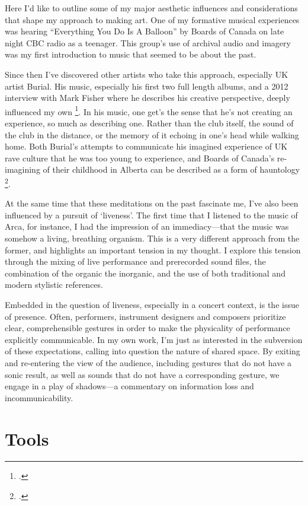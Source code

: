 \documentclass[12pt,twoside,maitrise]{dms_ks}
\theoremstyle{definition}
\begin{document}
{Here I'd like to outline some of my major aesthetic influences and considerations that shape my approach to making art. 
One of my formative musical experiences was hearing “Everything You Do Is A Balloon” by Boards of Canada on late night CBC radio as a teenager. 
This group's use of archival audio and imagery was my first introduction to music that seemed to be about the past. 

Since then I've discovered other artists who take this approach, especially UK artist Burial. 
His music, especially his first two full length albums, and a 2012 interview with Mark Fisher where he describes his creative perspective, deeply influenced my own \footcite{fisher_burial_2012}. 
In his music, one get's the sense that he's not creating an experience, so much as describing one. 
Rather than the club itself, the sound of the club in the distance, or the memory of it echoing in one's head while walking home. 
Both Burial's attempts to communicate his imagined experience of UK rave culture that he was too young to experience, and Boards of Canada's re-imagining of their childhood in Alberta can be described as a form of hauntology \footcite{alary_vers_2020}.

At the same time that these meditations on the past fascinate me, I've also been influenced by a pursuit of `liveness'. 
The first time that I listened to the music of Arca, for instance, I had the impression of an immediacy---that the music was somehow a living, breathing organism. 
This is a very different approach from the former, and highlights an important tension in my thought. 
I explore this tension through the mixing of live performance and prerecorded sound files, the combination of the organic the inorganic, and the use of both traditional and modern stylistic references.

Embedded in the question of liveness, especially in a concert context, is the issue of presence. 
Often, performers, instrument designers and composers prioritize clear, comprehensible gestures in order to make the physicality of performance explicitly communicable. 
In my own work, I'm just as interested in the subversion of these expectations, calling into question the nature of shared space. 
By exiting and re-entering the view of the audience, including gestures that do not have a sonic result, as well as sounds that do not have a corresponding gesture, we engage in a play of shadows---a commentary on information loss and incommunicability. 

\section{Tools}

}
\end{document}
